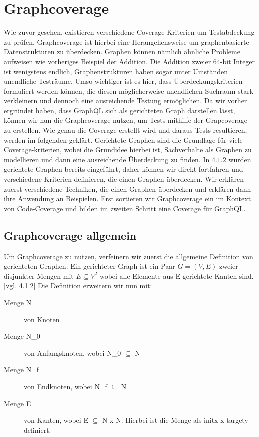 \chapter{Graphcoverage}

Wie zuvor gesehen, existieren verschiedene Coverage-Kriterien um Testabdeckung zu prüfen.
Graphcoverage ist hierbei eine Herangehensweise um graphenbasierte Datenstrukturen zu überdecken.
Graphen können nämlich ähnliche Probleme aufweisen wie vorheriges Beispiel der Addition.
Die Addition zweier 64-bit Integer ist wenigstens endlich, Graphenstrukturen haben sogar unter Umständen unendliche Testräume.
Umso wichtiger ist es hier, dass Überdeckungskriterien formuliert werden können, die diesen möglicherweise unendlichen Suchraum
stark verkleinern und dennoch eine ausreichende Testung ermöglichen.
Da wir vorher ergründet haben, dass GraphQL sich als gerichteten Graph darstellen lässt, können wir nun die Graphcoverage nutzen, um Tests mithilfe der Grapcoverage zu erstellen.
Wie genau die Coverage erstellt wird und daraus Tests resultieren, werden im folgenden geklärt.
Gerichtete Graphen sind die Grundlage für viele Coverage-kriterien, wobei die Grundidee hierbei ist,
Sachverhalte als Graphen zu modellieren und dann eine ausreichende Überdeckung zu finden. \cite[vgl. Software-testing S. 27 2.1]{software-testing}
In $4.1.2$ wurden gerichtete Graphen bereits eingeführt, daher können wir direkt fortfahren und verschiedene
Kriterien definieren, die einen Graphen überdecken.
Wir erklären zuerst verschiedene Techniken, die einen Graphen überdecken und erklären dann ihre Anwendung
an Beispielen.
Erst sortieren wir Graphcoverage ein im Kontext von Code-Coverage und bilden im zweiten Schritt eine Coverage für GraphQL\@.

\section{Graphcoverage allgemein}

Um Graphcoverage zu nutzen, verfeinern wir zuerst die allgemeine Definition von gerichteten Graphen.
Ein gerichteter Graph ist ein Paar $G = (V, E)$ zweier disjunkter Mengen mit $E \subseteq V^2$ wobei alle Elemente aus E gerichtete Kanten sind. [vgl. 4.1.2]
Die Definition erweitern wir nun mit:

\begin{description}
    \item[Menge N] von Knoten
    \item[Menge N_{0}] von Anfangsknoten, wobei N_{0} $\subseteq$ N
    \item[Menge N_{f}] von Endknoten, wobei N_{f} $\subseteq$ N
    \item[Menge E] von Kanten, wobei E $\subseteq$ N x N. Hierbei ist die Menge als init{x} x target{y} definiert.
\end{description}~\cite[2.1 Overview]{software-testing}

